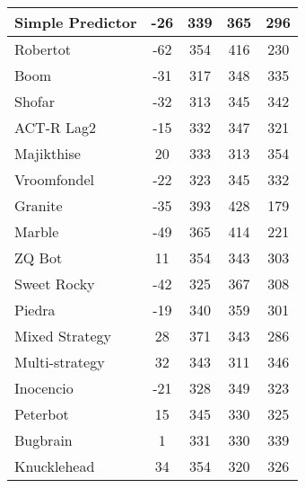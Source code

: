 \begin{table*}
\begin{tabular}{|l|c|c|c|c|}
Simple Predictor & -26 & 339 & 365 & 296 \\ \hline 
Robertot & -62 & 354 & 416 & 230 \\ \hline 
Boom & -31 & 317 & 348 & 335 \\ \hline 
Shofar & -32 & 313 & 345 & 342 \\ \hline 
ACT-R Lag2 & -15 & 332 & 347 & 321 \\ \hline 
Majikthise & 20 & 333 & 313 & 354 \\ \hline 
Vroomfondel & -22 & 323 & 345 & 332 \\ \hline 
Granite & -35 & 393 & 428 & 179 \\ \hline 
Marble & -49 & 365 & 414 & 221 \\ \hline 
ZQ Bot & 11 & 354 & 343 & 303 \\ \hline 
Sweet Rocky & -42 & 325 & 367 & 308 \\ \hline 
Piedra & -19 & 340 & 359 & 301 \\ \hline 
Mixed Strategy & 28 & 371 & 343 & 286 \\ \hline 
Multi-strategy & 32 & 343 & 311 & 346 \\ \hline 
Inocencio & -21 & 328 & 349 & 323 \\ \hline 
Peterbot & 15 & 345 & 330 & 325 \\ \hline 
Bugbrain & 1 & 331 & 330 & 339 \\ \hline 
Knucklehead & 34 & 354 & 320 & 326 \\ \hline
        \end{tabular}
    \end{table*}